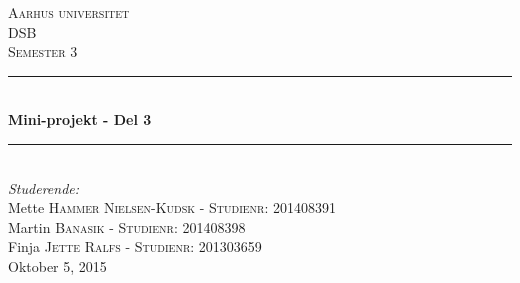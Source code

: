 \documentclass[12pt, letterpaper]{article}
\begin{document}
\begin{titlepage}

\newcommand{\HRule}{\rule{\linewidth}{0.5mm}} %

\center %
 

\textsc{\LARGE Aarhus universitet}\\[1.5cm] %
\textsc{\Large DSB}\\[0.5cm] %
\textsc{\large Semester 3}\\[0.5cm] %


\HRule \\[0.4cm]
{ \huge \bfseries Mini-projekt - Del 3}\\[0.4cm] %
\HRule \\[1.5cm]
 

\Large \emph{Studerende:}\\[1cm]
Mette \textsc{Hammer Nielsen-Kudsk - Studienr: 201408391}\\[0,5cm] %
Martin \textsc{Banasik - Studienr: 201408398}\\[0,5cm] %
Finja \textsc{Jette Ralfs - Studienr: 201303659}\\[0,5cm] %

{\large Oktober 5, 2015}\\[1,2cm] %


\end{titlepage}
\end{document}
